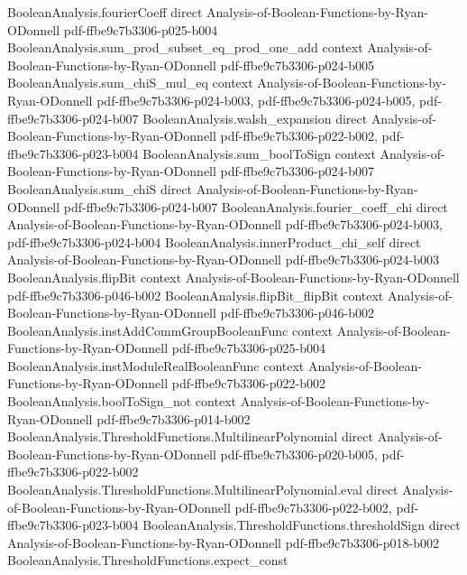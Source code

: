 \begin{theorem}
\proofstep
  {BooleanAnalysis.fourierCoeff}
  {direct}
  {Analysis-of-Boolean-Functions-by-Ryan-ODonnell}
  {pdf-ffbe9c7b3306-p025-b004}
\proofstep
  {BooleanAnalysis.sum_prod_subset_eq_prod_one_add}
  {context}
  {Analysis-of-Boolean-Functions-by-Ryan-ODonnell}
  {pdf-ffbe9c7b3306-p024-b005}
\proofstep
  {BooleanAnalysis.sum_chiS_mul_eq}
  {context}
  {Analysis-of-Boolean-Functions-by-Ryan-ODonnell}
  {pdf-ffbe9c7b3306-p024-b003,
    pdf-ffbe9c7b3306-p024-b005,
    pdf-ffbe9c7b3306-p024-b007}
\proofstep
  {BooleanAnalysis.walsh_expansion}
  {direct}
  {Analysis-of-Boolean-Functions-by-Ryan-ODonnell}
  {pdf-ffbe9c7b3306-p022-b002,
    pdf-ffbe9c7b3306-p023-b004}
\proofstep
  {BooleanAnalysis.sum_boolToSign}
  {context}
  {Analysis-of-Boolean-Functions-by-Ryan-ODonnell}
  {pdf-ffbe9c7b3306-p024-b007}
\proofstep
  {BooleanAnalysis.sum_chiS}
  {direct}
  {Analysis-of-Boolean-Functions-by-Ryan-ODonnell}
  {pdf-ffbe9c7b3306-p024-b007}
\proofstep
  {BooleanAnalysis.fourier_coeff_chi}
  {direct}
  {Analysis-of-Boolean-Functions-by-Ryan-ODonnell}
  {pdf-ffbe9c7b3306-p024-b003,
    pdf-ffbe9c7b3306-p024-b004}
\proofstep
  {BooleanAnalysis.innerProduct_chi_self}
  {direct}
  {Analysis-of-Boolean-Functions-by-Ryan-ODonnell}
  {pdf-ffbe9c7b3306-p024-b003}
\proofstep
  {BooleanAnalysis.flipBit}
  {context}
  {Analysis-of-Boolean-Functions-by-Ryan-ODonnell}
  {pdf-ffbe9c7b3306-p046-b002}
\proofstep
  {BooleanAnalysis.flipBit_flipBit}
  {context}
  {Analysis-of-Boolean-Functions-by-Ryan-ODonnell}
  {pdf-ffbe9c7b3306-p046-b002}
\proofstep
  {BooleanAnalysis.instAddCommGroupBooleanFunc}
  {context}
  {Analysis-of-Boolean-Functions-by-Ryan-ODonnell}
  {pdf-ffbe9c7b3306-p025-b004}
\proofstep
  {BooleanAnalysis.instModuleRealBooleanFunc}
  {context}
  {Analysis-of-Boolean-Functions-by-Ryan-ODonnell}
  {pdf-ffbe9c7b3306-p022-b002}
\proofstep
  {BooleanAnalysis.boolToSign_not}
  {context}
  {Analysis-of-Boolean-Functions-by-Ryan-ODonnell}
  {pdf-ffbe9c7b3306-p014-b002}
\proofstep
  {BooleanAnalysis.ThresholdFunctions.MultilinearPolynomial}
  {direct}
  {Analysis-of-Boolean-Functions-by-Ryan-ODonnell}
  {pdf-ffbe9c7b3306-p020-b005,
    pdf-ffbe9c7b3306-p022-b002}
\proofstep
  {BooleanAnalysis.ThresholdFunctions.MultilinearPolynomial.eval}
  {direct}
  {Analysis-of-Boolean-Functions-by-Ryan-ODonnell}
  {pdf-ffbe9c7b3306-p022-b002,
    pdf-ffbe9c7b3306-p023-b004}
\proofstep
  {BooleanAnalysis.ThresholdFunctions.thresholdSign}
  {direct}
  {Analysis-of-Boolean-Functions-by-Ryan-ODonnell}
  {pdf-ffbe9c7b3306-p018-b002}
\proofstep
  {BooleanAnalysis.ThresholdFunctions.expect_const}

\end{theorem}
